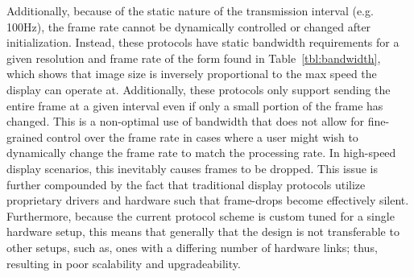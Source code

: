     Additionally, because of the static nature of the transmission interval (e.g. 100Hz), the frame rate cannot be dynamically controlled or changed after initialization. Instead, these protocols have static bandwidth requirements for a given resolution and frame rate of the form found in Table~\ref{tbl:bandwidth}, which shows that image size is inversely proportional to the max speed the display can operate at. Additionally, these protocols only support sending the entire frame at a given interval even if only a small portion of the frame has changed. This is a non-optimal use of bandwidth that does not allow for fine-grained control over the frame rate in cases where a user might wish to dynamically change the frame rate to match the processing rate. In high-speed display scenarios, this inevitably causes frames to be dropped. This issue is further compounded by the fact that traditional display protocols utilize proprietary drivers and hardware such that frame-drops become effectively silent.  Furthermore, because the current protocol scheme is custom tuned for a single hardware setup, this means that generally that the design is not transferable to other setups, such as, ones with a differing number of hardware links; thus, resulting in poor scalability and upgradeability.


